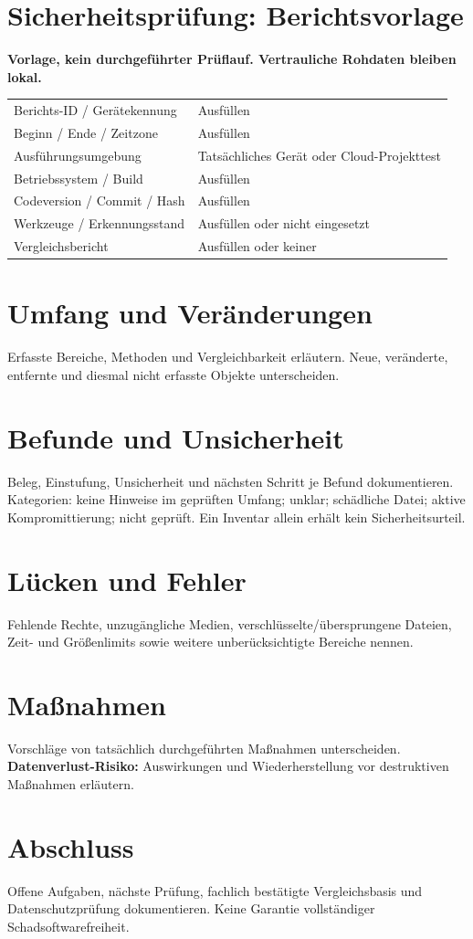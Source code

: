 \documentclass[11pt,a4paper]{article}
\begin{document}
\section*{Sicherheitsprüfung: Berichtsvorlage}
\textbf{Vorlage, kein durchgeführter Prüflauf. Vertrauliche Rohdaten bleiben lokal.}
\begin{tabularx}{\linewidth}{lX}
\toprule
Berichts-ID / Gerätekennung & Ausfüllen \\
Beginn / Ende / Zeitzone & Ausfüllen \\
Ausführungsumgebung & Tatsächliches Gerät oder Cloud-Projekttest \\
Betriebssystem / Build & Ausfüllen \\
Codeversion / Commit / Hash & Ausfüllen \\
Werkzeuge / Erkennungsstand & Ausfüllen oder nicht eingesetzt \\
Vergleichsbericht & Ausfüllen oder keiner \\
\bottomrule
\end{tabularx}
\section*{Umfang und Veränderungen}
Erfasste Bereiche, Methoden und Vergleichbarkeit erläutern. Neue, veränderte,
entfernte und diesmal nicht erfasste Objekte unterscheiden.
\section*{Befunde und Unsicherheit}
Beleg, Einstufung, Unsicherheit und nächsten Schritt je Befund dokumentieren.
Kategorien: keine Hinweise im geprüften Umfang; unklar; schädliche Datei;
aktive Kompromittierung; nicht geprüft. Ein Inventar allein erhält kein
Sicherheitsurteil.
\section*{Lücken und Fehler}
Fehlende Rechte, unzugängliche Medien, verschlüsselte/übersprungene Dateien,
Zeit- und Größenlimits sowie weitere unberücksichtigte Bereiche nennen.
\section*{Maßnahmen}
Vorschläge von tatsächlich durchgeführten Maßnahmen unterscheiden.
\textbf{Datenverlust-Risiko:} Auswirkungen und Wiederherstellung vor destruktiven
Maßnahmen erläutern.
\section*{Abschluss}
Offene Aufgaben, nächste Prüfung, fachlich bestätigte Vergleichsbasis und
Datenschutzprüfung dokumentieren. Keine Garantie vollständiger Schadsoftwarefreiheit.
\end{document}
